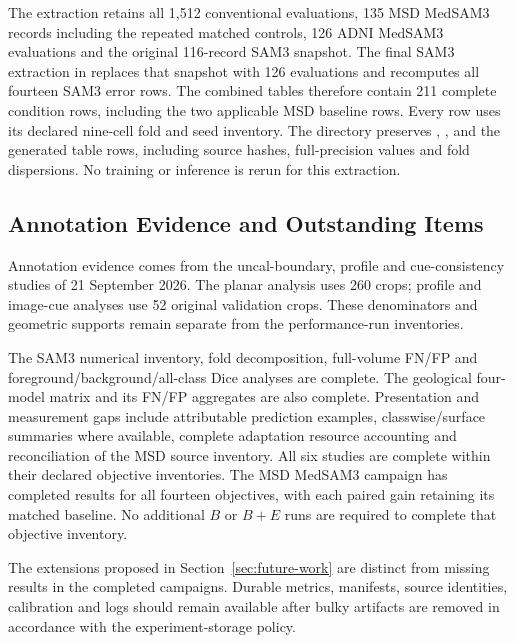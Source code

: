 The extraction retains all 1,512 conventional evaluations, 135 MSD
MedSAM3 records including the repeated matched controls, 126 ADNI
MedSAM3 evaluations and the original 116-record SAM3 snapshot.
The final SAM3 extraction in 
replaces that snapshot with 126 evaluations and recomputes all
fourteen SAM3 error rows. The combined tables therefore contain
211 complete condition rows, including the two applicable MSD baseline
rows. Every row uses its declared nine-cell fold and seed inventory. The directory preserves
, ,
 and the generated table rows, including source
hashes, full-precision values and fold dispersions. No training or
inference is rerun for this extraction.

\subsection{Annotation Evidence and Outstanding Items}

Annotation evidence comes from the uncal-boundary, profile and
cue-consistency studies of 21 September 2026.
The planar analysis uses 260 crops; profile and image-cue analyses use 52 original
validation crops. These denominators and geometric supports remain
separate from the performance-run inventories.

The SAM3 numerical inventory, fold decomposition, full-volume FN/FP
and foreground/background/all-class Dice analyses are complete.
The geological four-model matrix and its FN/FP aggregates are also
complete. Presentation
and measurement gaps include attributable prediction examples,
classwise/surface summaries where available, complete adaptation
resource accounting and reconciliation of the MSD source inventory.
All six studies are complete within their declared objective inventories. The MSD MedSAM3 campaign has completed results for all
fourteen objectives, with each paired gain retaining its matched baseline. No additional $B$ or $B+E$ runs are required to
complete that objective inventory.

The extensions proposed in Section~\ref{sec:future-work} are distinct
from missing results in the completed campaigns. Durable metrics,
manifests, source identities, calibration and logs should remain
available after bulky artifacts are removed in accordance with the
experiment-storage policy.

\clearpage



